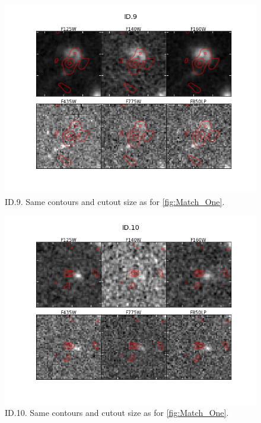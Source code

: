 \begin{figure}[tbp]
\centering \includegraphics[width=160mm]{Matched/ASPECS_Cutout_8.png}
\caption{ID.9. Same contours and cutout size as for \ref{fig:Match_One}.}
\label{fig:Match_Three}
\end{figure}

\begin{figure}[tbp]
\centering \includegraphics[width=160mm]{Matched/ASPECS_Cutout_9.png}
\caption{ID.10. Same contours and cutout size as for \ref{fig:Match_One}.}
\label{fig:Match_Three}
\end{figure}


